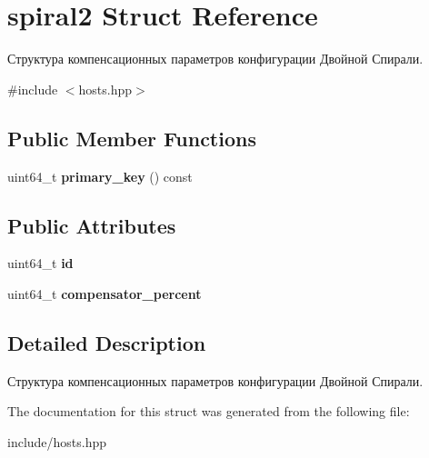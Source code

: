 \hypertarget{structspiral2}{}\section{spiral2 Struct Reference}
\label{structspiral2}


Структура компенсационных параметров конфигурации Двойной Спирали.  




{\ttfamily \#include $<$hosts.\+hpp$>$}

\subsection*{Public Member Functions}
\begin{DoxyCompactItemize}
\item 
\mbox{\label{structspiral2_a0432f80414e4f3ec3b85c50ac335f3ff}} 
uint64\+\_\+t {\bfseries primary\+\_\+key} () const
\end{DoxyCompactItemize}
\subsection*{Public Attributes}
\begin{DoxyCompactItemize}
\item 
\mbox{\label{structspiral2_a8350391d8b0d686ae7e11c7706b4d3d6}} 
uint64\+\_\+t {\bfseries id}
\item 
\mbox{\label{structspiral2_a9266c6802c921a3b7006ddc9aa003b29}} 
uint64\+\_\+t {\bfseries compensator\+\_\+percent}
\end{DoxyCompactItemize}


\subsection{Detailed Description}
Структура компенсационных параметров конфигурации Двойной Спирали. 

The documentation for this struct was generated from the following file\+:\begin{DoxyCompactItemize}
\item 
include/hosts.\+hpp\end{DoxyCompactItemize}
